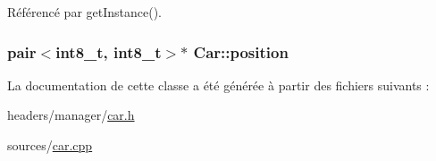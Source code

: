 Référencé par get\-Instance().

\hypertarget{classCar_a43e9c00e78af10fc998624a811e014df}{
\subsubsection[{position}]{\setlength{\rightskip}{0pt plus 5cm}pair$<$int8\-\_\-t, int8\-\_\-t$>$$\ast$ Car\-::position\hspace{0.3cm}{\ttfamily [private]}}}\label{classCar_a43e9c00e78af10fc998624a811e014df}


La documentation de cette classe a été générée à partir des fichiers suivants \-:\begin{DoxyCompactItemize}
\item 
headers/manager/\hyperlink{car_8h}{car.\-h}\item 
sources/\hyperlink{car_8cpp}{car.\-cpp}\end{DoxyCompactItemize}
